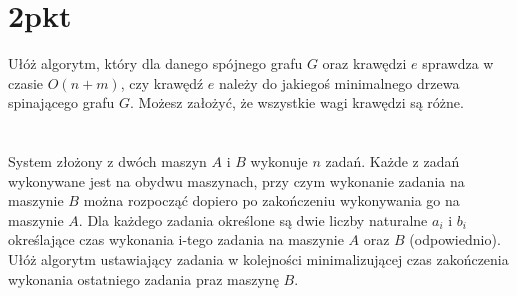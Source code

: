 \documentclass[svgnames]{report}
\begin{document}
\section{2pkt}
\begin{framed}
Ułóż algorytm, który dla danego spójnego grafu $G$ oraz krawędzi $e$ sprawdza w czasie $O(n + m)$, czy krawędź $e$ należy do jakiegoś minimalnego drzewa spinającego grafu $G$. Możesz założyć, że wszystkie wagi krawędzi są różne.
\end{framed}

\section{}
\begin{framed}
System złożony z dwóch maszyn $A$ i $B$ wykonuje $n$ zadań. Każde z zadań wykonywane jest na obydwu maszynach, przy czym wykonanie zadania na maszynie $B$ można rozpocząć dopiero po zakończeniu wykonywania go na maszynie $A$. Dla każdego zadania określone są dwie liczby naturalne $a_i$ i $b_i$ określające czas wykonania i-tego zadania na maszynie $A$ oraz $B$ (odpowiednio). Ułóż algorytm ustawiający zadania w kolejności minimalizującej czas zakończenia wykonania ostatniego zadania praz maszynę $B$.
\end{framed}
\end{document}
